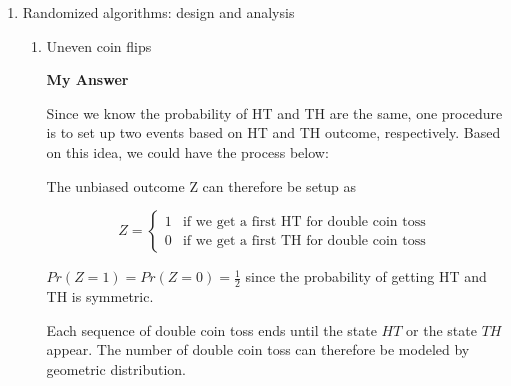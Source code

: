 \documentclass{article}
\begin{document}
\begin{enumerate}
\item  Randomized algorithms: design and analysis

\begin{enumerate}[label*=\arabic*.]

\item Uneven coin flips
\gap


\textbf{My Answer}

Since we know the probability of HT and TH are the same, one procedure is to set up two events based on HT and TH outcome, respectively. Based on this idea, we could have the process below:


The unbiased outcome Z can therefore be setup as

$$ Z = 
\begin{cases}
1 & \text{if we get a first HT for double coin toss} \\
0 & \text{if we get a first TH for double coin toss}
\end{cases}
$$

$Pr(Z = 1) = Pr(Z = 0) = \frac{1}{2}$ since the probability of getting HT and TH is symmetric.

Each sequence of double coin toss ends until the state $HT$ or the state $TH$ appear. The number of double coin toss can therefore be modeled by geometric distribution.


\end{enumerate}
\end{enumerate}
\end{document}
